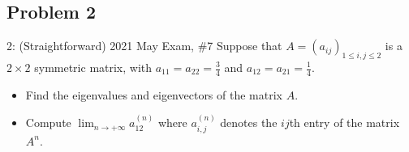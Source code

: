 \documentclass[../main]{subfiles}
\begin{document}
\subsection{Problem 2}
\begin{bbox}{2: (Straightforward) {2021 May Exam, \#7}}
    Suppose that $A=(a_{ij})_{1\le i,j \le 2}$ is a $2\times 2$ symmetric matrix, with $a_{11} = a_{22} =\frac{3}{4}$ and $a_{12} = a_{21} = \frac{1}{4}$. 
    \begin{itemize}
        \item Find the eigenvalues and eigenvectors of the matrix $A$.
        \item Compute $\lim_{n\to +\infty} a_{12}^{(n)}$ where $a_{i,j}^{(n)}$ denotes the $ij$th entry of the matrix $A^n$.
    \end{itemize}
\end{bbox}
\end{document}
